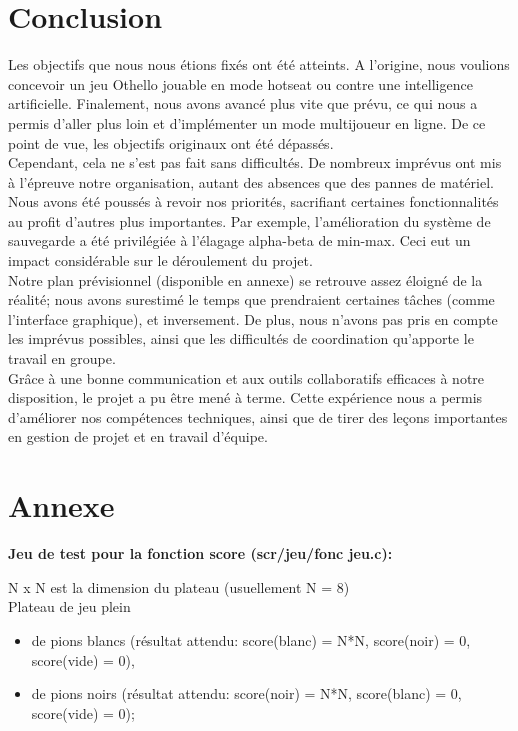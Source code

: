 \documentclass[12pt, a4paper, oneside]{article}
\begin{document}
\section{Conclusion}


Les objectifs que nous nous étions fixés ont été atteints. A l'origine, nous voulions concevoir un jeu Othello jouable en mode hotseat ou contre une intelligence artificielle. Finalement, nous avons avancé plus vite que prévu, ce qui nous a permis d'aller plus loin et d'implémenter un mode multijoueur en ligne. De ce point de vue, les objectifs originaux ont été dépassés. \\

Cependant, cela ne s'est pas fait sans difficultés. De nombreux imprévus ont mis à l'épreuve notre organisation, autant des absences que des pannes de matériel. Nous avons été poussés à revoir nos priorités, sacrifiant certaines fonctionnalités au profit d'autres plus importantes. Par exemple, l'amélioration du système de sauvegarde a été privilégiée à l'élagage alpha-beta de min-max. Ceci eut un impact considérable sur le déroulement du projet. \\

Notre plan prévisionnel (disponible en annexe) se retrouve assez éloigné de la réalité; nous avons surestimé le temps que prendraient certaines tâches (comme l'interface graphique), et inversement. De plus, nous n'avons pas pris en compte les imprévus possibles, ainsi que les difficultés de coordination qu'apporte le travail en groupe. \\

Grâce à une bonne communication et aux outils collaboratifs efficaces à notre disposition, le projet a pu être mené à terme. Cette expérience nous a permis d’améliorer nos compétences techniques, ainsi que de tirer des leçons importantes en gestion de projet et en travail d’équipe.

\newpage 
\section{Annexe}
    \textbf{Jeu de test pour la fonction score (scr/jeu/fonc\textunderscore
    jeu.c):}

    N x N est la dimension du plateau (usuellement N = 8) \\

    Plateau de jeu plein
    \begin{itemize} 
        \item de pions blancs (résultat attendu: score(blanc) = N*N, score(noir) = 0, score(vide) = 0),
        \item de pions noirs (résultat attendu: score(noir) = N*N, score(blanc) = 0, score(vide) = 0);
    \end{itemize} 
\end{document}
